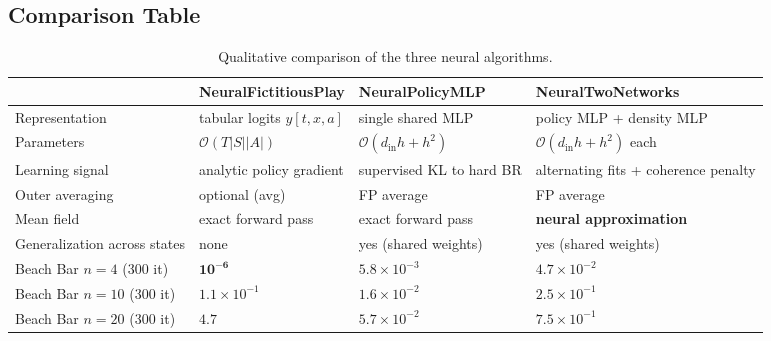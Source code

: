 \documentclass[11pt,a4paper]{article}
\begin{document}
\begin{center}
\end{center}

\subsection{Comparison Table}

\begin{table}[h]
\centering\small
\caption{Qualitative comparison of the three neural algorithms.}
\begin{tabular}{lp{3.4cm}p{3.4cm}p{3.4cm}}
\toprule
 & \textbf{NeuralFictitiousPlay} & \textbf{NeuralPolicyMLP} & \textbf{NeuralTwoNetworks} \\
\midrule
Representation & tabular logits $y[t,x,a]$ & single shared MLP & policy MLP + density MLP \\
Parameters & $\mathcal{O}(T |S| |A|)$ & $\mathcal{O}(d_{\mathrm{in}} h + h^2)$ & $\mathcal{O}(d_{\mathrm{in}} h + h^2)$ each \\
Learning signal & analytic policy gradient & supervised KL to hard BR & alternating fits + coherence penalty \\
Outer averaging & optional (avg) & FP average & FP average \\
Mean field & exact forward pass & exact forward pass & \textbf{neural approximation} \\
Generalization across states & none & yes (shared weights) & yes (shared weights) \\
\midrule
Beach Bar $n{=}4$ (300 it) & $\mathbf{10^{-6}}$ & $5.8 \times 10^{-3}$ & $4.7 \times 10^{-2}$ \\
Beach Bar $n{=}10$ (300 it) & $1.1 \times 10^{-1}$ & $1.6 \times 10^{-2}$ & $2.5 \times 10^{-1}$ \\
Beach Bar $n{=}20$ (300 it) & $4.7$ & $5.7 \times 10^{-2}$ & $7.5 \times 10^{-1}$ \\
\bottomrule
\end{tabular}
\end{table}
\end{document}
